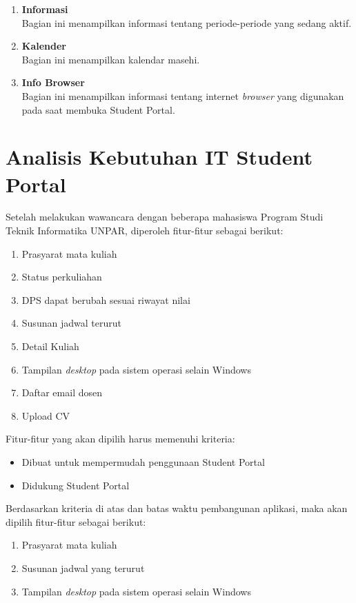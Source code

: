 \begin{enumerate}
	\item \textbf{Informasi}\\
		Bagian ini menampilkan informasi tentang periode-periode yang sedang aktif.
	\item \textbf{Kalender}\\
		Bagian ini menampilkan kalendar masehi.
	\item \textbf{Info Browser}\\
		Bagian ini menampilkan informasi tentang internet \textit{browser} yang digunakan pada saat membuka Student Portal. 
\end{enumerate}

\section{Analisis Kebutuhan IT Student Portal}
Setelah melakukan wawancara dengan beberapa mahasiswa Program Studi Teknik Informatika UNPAR, diperoleh fitur-fitur sebagai berikut:
\begin{enumerate}
	\item Prasyarat mata kuliah
	\item Status perkuliahan
	\item DPS dapat berubah sesuai riwayat nilai
	\item Susunan jadwal terurut
	\item Detail Kuliah
	\item Tampilan \textit{desktop} pada sistem operasi selain Windows 
	\item Daftar email dosen
	\item Upload CV
\end{enumerate}
Fitur-fitur yang akan dipilih harus memenuhi kriteria:
\begin{itemize}
	\item Dibuat untuk mempermudah penggunaan Student Portal
	\item Didukung Student Portal
\end{itemize}
Berdasarkan kriteria di atas dan batas waktu pembangunan aplikasi, maka akan dipilih fitur-fitur sebagai berikut:
\begin{enumerate}
	\item Prasyarat mata kuliah
	\item Susunan jadwal yang terurut 
	\item Tampilan \textit{desktop} pada sistem operasi selain Windows
\end{enumerate}


